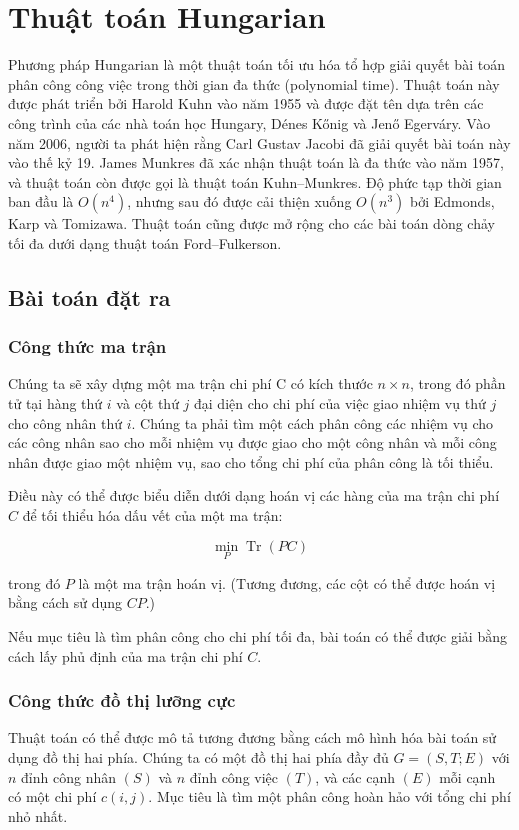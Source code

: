 \section{Thuật toán Hungarian}
Phương pháp Hungarian là một thuật toán tối ưu hóa tổ hợp giải quyết
bài toán phân công công việc trong thời gian đa thức (polynomial time).
Thuật toán này được phát triển bởi Harold Kuhn vào năm 1955
và được đặt tên dựa trên các công trình của các nhà toán học Hungary,
Dénes Kőnig và Jenő Egerváry.
Vào năm 2006, người ta phát hiện rằng Carl Gustav Jacobi đã giải quyết bài toán này vào thế kỷ 19.
James Munkres đã xác nhận thuật toán là đa thức vào năm 1957, và thuật toán còn được gọi là thuật toán Kuhn–Munkres.
Độ phức tạp thời gian ban đầu là \( O(n^4) \), nhưng sau đó được cải thiện xuống \( O(n^3) \) bởi Edmonds, Karp và Tomizawa. Thuật toán cũng được mở rộng cho các bài toán dòng chảy tối đa dưới dạng thuật toán Ford–Fulkerson.
\subsection{Bài toán đặt ra}
\subsubsection{Công thức ma trận}

Chúng ta sẽ xây dựng một ma trận chi phí C có kích thước \( n \times n \), trong đó phần tử tại hàng thứ \( i \) và cột thứ \( j \) đại diện cho chi phí của việc giao nhiệm vụ thứ \( j \) cho công nhân thứ \( i \). Chúng ta phải tìm một cách phân công các nhiệm vụ cho các công nhân sao cho mỗi nhiệm vụ được giao cho một công nhân và mỗi công nhân được giao một nhiệm vụ, sao cho tổng chi phí của phân công là tối thiểu.

Điều này có thể được biểu diễn dưới dạng hoán vị các hàng của ma trận chi phí \( C \) để tối thiểu hóa dấu vết của một ma trận:

\[
\min_{P} \operatorname{Tr}(PC)
\]

trong đó \( P \) là một ma trận hoán vị. (Tương đương, các cột có thể được hoán vị bằng cách sử dụng \( CP \).)

Nếu mục tiêu là tìm phân công cho chi phí tối đa, bài toán có thể được giải bằng cách lấy phủ định của ma trận chi phí \( C \).
\subsubsection{Công thức đồ thị lưỡng cực}
Thuật toán có thể được mô tả tương đương bằng cách mô hình hóa bài toán sử dụng đồ thị hai phía. Chúng ta có một đồ thị hai phía đầy đủ \( G = (S, T; E) \) với \( n \) đỉnh công nhân \( (S) \) và \( n \) đỉnh công việc \( (T) \), và các cạnh \( (E) \) mỗi cạnh có một chi phí \( c(i, j) \). Mục tiêu là tìm một phân công hoàn hảo với tổng chi phí nhỏ nhất.
